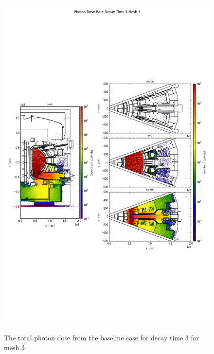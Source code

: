 \begin{figure}[ht!]
\centering
\includegraphics[trim={0cm 9cm 0cm 10cm},clip,scale=0.75]{../plots/final_model/Photon_Dose_Rate_Decay_Time_3_Mesh_3.png}
\label{fig:photons_dc3_no4bc_m3_flux}
\caption{The total photon dose from the baseline case for decay time 3 for mesh 3}
\end{figure}
